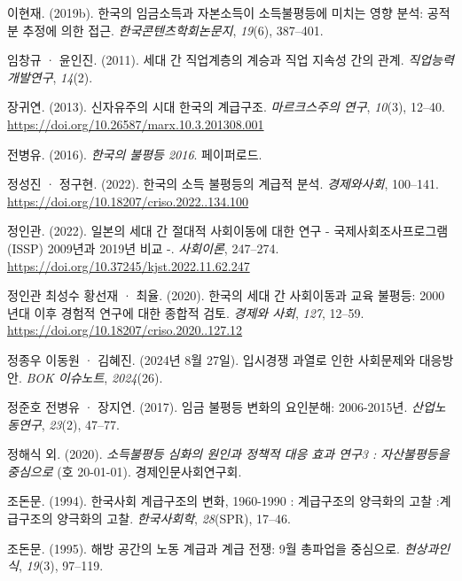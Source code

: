 \documentclass[
  letterpaper,
  DIV=11,
  numbers=noendperiod]{scrartcl}
\newlength{\cslhangindent}
\newenvironment{CSLReferences}[2] %
 {\begin{list}{}{%
  \setlength{\itemindent}{0pt}
  \setlength{\leftmargin}{0pt}
  \setlength{\parsep}{0pt}
  \ifodd #1
   \setlength{\leftmargin}{\cslhangindent}
   \setlength{\itemindent}{-1\cslhangindent}
  \fi
  \setlength{\itemsep}{#2\baselineskip}}}
 {\end{list}}
\begin{document}
\begin{CSLReferences}{1}{0}
이현재. (2019b). {한국의 임금소득과 자본소득이 소득불평등에 미치는 영향
분석: 공적분 추정에 의한 접근}. \emph{한국콘텐츠학회논문지},
\emph{19}(6), 387--401.

임창규 · 윤인진. (2011). 세대 간 직업계층의 계승과 직업 지속성 간의
관계. \emph{직업능력개발연구}, \emph{14}(2).

장귀연. (2013). {신자유주의 시대 한국의 계급구조}. \emph{마르크스주의
연구}, \emph{10}(3), 12--40.
\url{https://doi.org/10.26587/marx.10.3.201308.001}

전병유. (2016). \emph{한국의 불평등 2016}. 페이퍼로드.

정성진 · 정구현. (2022). {한국의 소득 불평등의 계급적 분석}.
\emph{경제와사회}, 100--141.
\url{https://doi.org/10.18207/criso.2022..134.100}

정인관. (2022). {일본의 세대 간 절대적 사회이동에 대한 연구 -
국제사회조사프로그램(ISSP) 2009년과 2019년 비교 -}. \emph{사회이론},
247--274. \url{https://doi.org/10.37245/kjst.2022.11.62.247}

정인관 최성수 황선재 · 최율. (2020). {한국의 세대 간 사회이동과 교육
불평등: 2000년대 이후 경험적 연구에 대한 종합적 검토}. \emph{경제와
사회}, \emph{127}, 12--59.
\url{https://doi.org/10.18207/criso.2020..127.12}

정종우 이동원 · 김혜진. (2024년 8월 27일). 입시경쟁 과열로 인한
사회문제와 대응방안. \emph{BOK 이슈노트}, \emph{2024}(26).

정준호 전병유 · 장지연. (2017). {임금 불평등 변화의 요인분해:
2006-2015년}. \emph{산업노동연구}, \emph{23}(2), 47--77.

정해식 외. (2020). \emph{{소득불평등 심화의 원인과 정책적 대응 효과
연구3 : 자산불평등을 중심으로}} (호 20-01-01). 경제인문사회연구회.

조돈문. (1994). {한국사회 계급구조의 변화, 1960-1990 : 계급구조의
양극화의 고찰 :계급구조의 양극화의 고찰}. \emph{한국사회학},
\emph{28}(SPR), 17--46.

조돈문. (1995). {해방 공간의 노동 계급과 계급 전쟁: 9월 총파업을
중심으로}. \emph{현상과인식}, \emph{19}(3), 97--119.


\end{CSLReferences}
\end{document}
